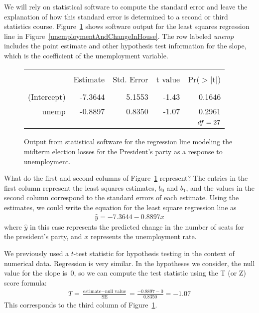 We will rely on statistical software to compute the standard
error and leave the explanation of how this standard error
is determined to a second or third statistics course.
Figure~\ref{midtermUnempRegTable} shows software output for
the least squares regression line in
Figure~\ref{unemploymentAndChangeInHouse}.
The row labeled \emph{unemp} includes the point estimate
and other hypothesis test information for the slope,
which is the coefficient of the unemployment variable.

\begin{figure}[ht]
\centering
\begin{tabular}{rrrrr}
  \hline
  \vspace{-3.7mm} & & & & \\
  & Estimate & Std. Error & t value & Pr($>$$|$t$|$) \\ 
  \hline
  \vspace{-3.6mm} & & & & \\
  (Intercept) & -7.3644 & 5.1553 & -1.43 & 0.1646 \\ 
  unemp & -0.8897 & 0.8350 & -1.07 & 0.2961 \\ 
  \hline
  \multicolumn{5}{r}{$df=27{}$} \\
\end{tabular}
\caption{Output from statistical software for the regression
    line modeling the midterm election losses for the
    President's party as a response to unemployment.}
\label{midtermUnempRegTable}
\end{figure}

\begin{examplewrap}
\begin{nexample}{What do the first and second columns
    of Figure~\ref{midtermUnempRegTable} represent?}
  The entries in the first column represent the least
  squares estimates, $b_0$ and $b_1$, and the values in
  the second column correspond to the standard errors
  of each estimate.
  Using the estimates, we could write the equation
  for the least square regression line as
  \begin{align*}
  \hat{y} = -7.3644 - 0.8897 x
  \end{align*}
  where $\hat{y}$ in this case represents the predicted
  change in the number of seats for the president's party,
  and $x$ represents the unemployment rate.
\end{nexample}
\end{examplewrap}

We previously used a $t$-test statistic for hypothesis testing
in the context of numerical data.
Regression is very similar.
In the hypotheses we consider, the null value for the slope is~0,
so we can compute the test statistic using the T (or Z) score
formula:
\begin{align*}
T
  = \frac{\text{estimate} - \text{null value}}{\text{SE}}
  = \frac{-0.8897 - 0}{0.8350}
  = -1.07
\end{align*}
This corresponds to the third column of
Figure~\ref{midtermUnempRegTable}.

